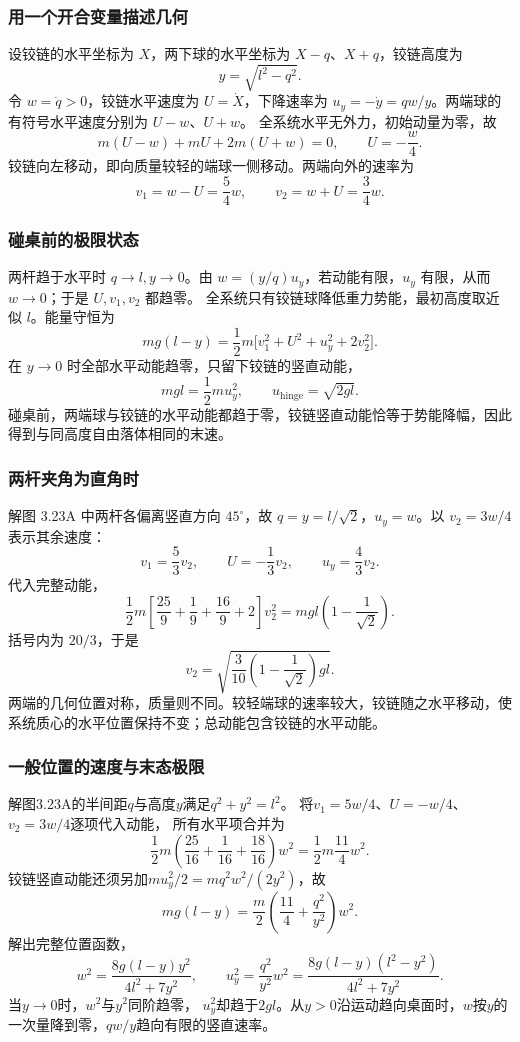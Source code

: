 \documentclass[UTF8,fontset=fandol,a4paper,11pt]{ctexart}
\begin{document}
\subsubsection*{用一个开合变量描述几何}
设铰链的水平坐标为 $X$，两下球的水平坐标为 $X-q$、$X+q$，铰链高度为
\[
y=\sqrt{l^2-q^2}.
\]
令 $w=\dot q>0$，铰链水平速度为 $U=\dot X$，下降速率为 $u_y=-\dot y=qw/y$。两端球的有符号水平速度分别为 $U-w$、$U+w$。
全系统水平无外力，初始动量为零，故
\[
m(U-w)+mU+2m(U+w)=0,
\qquad \boxed{U=-\frac w4}.
\]
铰链向左移动，即向质量较轻的端球一侧移动。两端向外的速率为
\[
v_1=w-U=\frac54w,\qquad
v_2=w+U=\frac34w.
\]

\subsubsection*{碰桌前的极限状态}
两杆趋于水平时 $q\to l,y\to0$。由 $w=(y/q)u_y$，若动能有限，$u_y$ 有限，从而 $w\to0$；于是 $U,v_1,v_2$ 都趋零。
全系统只有铰链球降低重力势能，最初高度取近似 $l$。能量守恒为
\[
m g(l-y)=\frac12m\bigl[v_1^2+U^2+u_y^2+2v_2^2\bigr].
\]
在 $y\to0$ 时全部水平动能趋零，只留下铰链的竖直动能，
\[
mgl=\frac12mu_y^2,\qquad
\boxed{u_{\mathrm{hinge}}=\sqrt{2gl}}.
\]
碰桌前，两端球与铰链的水平动能都趋于零，铰链竖直动能恰等于势能降幅，因此得到与同高度自由落体相同的末速。

\subsubsection*{两杆夹角为直角时}
解图 3.23A 中两杆各偏离竖直方向 $45^\circ$，故 $q=y=l/\sqrt2$，$u_y=w$。以 $v_2=3w/4$ 表示其余速度：
\[
v_1=\frac53v_2,\qquad U=-\frac13v_2,\qquad
u_y=\frac43v_2.
\]
代入完整动能，
\[
\frac12m\left[\frac{25}{9}+\frac19+\frac{16}{9}+2\right]v_2^2
=mgl\left(1-\frac1{\sqrt2}\right).
\]
括号内为 $20/3$，于是
\[
\boxed{v_2=\sqrt{\frac3{10}
\left(1-\frac1{\sqrt2}\right)gl}}.
\]
两端的几何位置对称，质量则不同。较轻端球的速率较大，铰链随之水平移动，使系统质心的水平位置保持不变；总动能包含铰链的水平动能。
\subsubsection*{一般位置的速度与末态极限}
解图3.23A的半间距$q$与高度$y$满足$q^2+y^2=l^2$。
将$v_1=5w/4$、$U=-w/4$、$v_2=3w/4$逐项代入动能，
所有水平项合并为
\[
\frac12m\left(\frac{25}{16}+\frac1{16}+\frac{18}{16}\right)w^2
=\frac12m\frac{11}{4}w^2.
\]
铰链竖直动能还须另加$mu_y^2/2=mq^2w^2/(2y^2)$，故
\[
mg(l-y)=\frac m2\left(\frac{11}{4}+\frac{q^2}{y^2}\right)w^2.
\]
解出完整位置函数，
\[
w^2=\frac{8g(l-y)y^2}{4l^2+7y^2},\qquad
u_y^2=\frac{q^2}{y^2}w^2
=\frac{8g(l-y)(l^2-y^2)}{4l^2+7y^2}.
\]
当$y\to0$时，$w^2$与$y^2$同阶趋零，
$u_y^2$却趋于$2gl$。从$y>0$沿运动趋向桌面时，$w$按$y$的一次量降到零，$qw/y$趋向有限的竖直速率。
\end{document}
